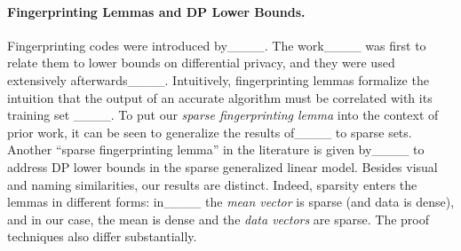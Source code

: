 \paragraph{Fingerprinting Lemmas and DP Lower Bounds.}
Fingerprinting codes were introduced by____. The work____ was first to relate them to lower bounds on differential privacy, and they were used extensively afterwards____. Intuitively, fingerprinting lemmas formalize the intuition that the output of an accurate algorithm must be correlated with its training set ____. To put our \emph{sparse fingerprinting lemma} into the context of prior work, it can be seen to generalize the results of____ to sparse sets. 
Another ``sparse fingerprinting lemma'' in the literature is given by____ to address DP lower bounds in the sparse generalized linear model. Besides visual and naming similarities, our results are distinct. Indeed, sparsity enters the lemmas in different forms: in____ the \emph{mean vector} is sparse (and data is dense), and in our case, the mean is dense and the \emph{data vectors} are sparse. The proof techniques also differ substantially.